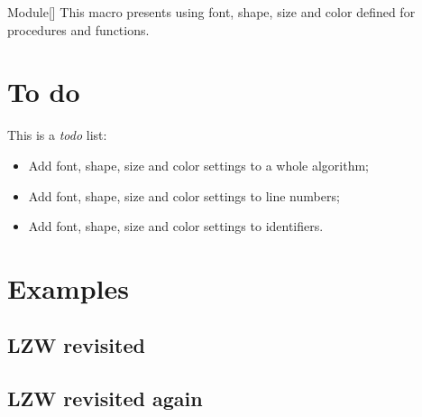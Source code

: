 \documentclass[a4paper, 11pt]{article}
\begin{document}
\begin{macro}{Module}[]
    This macro presents  using font, shape, size and color defined for procedures and functions.
\end{macro}


\section{To do}
This is a \textit{todo} list:
\begin{itemize}
    \item Add font, shape, size and color settings to a whole algorithm;
    \item Add font, shape, size and color settings to line numbers;
    \item Add font, shape, size and color settings to identifiers.
\end{itemize}


\section{Examples}

\subsection{LZW revisited}
\begingroup
\begin{latexcode}
\end{latexcode}


\endgroup

\subsection{LZW revisited again}
\begingroup
\begin{latexcode}
\end{latexcode}


\endgroup


\printindex
\end{document}
